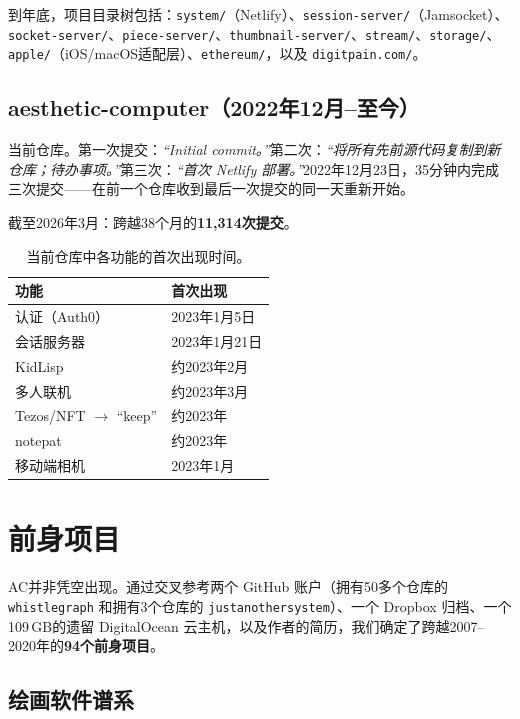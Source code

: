 \documentclass[10pt,letterpaper,twocolumn]{article}
\begin{document}
到年底，项目目录树包括：\texttt{system/}（Netlify）、\texttt{session-server/}（Jamsocket）、\texttt{socket-server/}、\texttt{piece-server/}、\texttt{thumbnail-server/}、\texttt{stream/}、\texttt{storage/}、\texttt{apple/}（iOS/macOS适配层）、\texttt{ethereum/}，以及 \texttt{digitpain.com/}。

\subsection{aesthetic-computer（2022年12月--至今）}

当前仓库。第一次提交：\emph{``Initial commit。''}第二次：\emph{``将所有先前源代码复制到新仓库；待办事项。''}第三次：\emph{``首次 Netlify 部署。''}2022年12月23日，35分钟内完成三次提交——在前一个仓库收到最后一次提交的同一天重新开始。

截至2026年3月：跨越38个月的\textbf{11,314次提交}。

\begin{table}[h]
\small
\centering
\begin{tabular}{ll}
\toprule
\textbf{功能} & \textbf{首次出现} \\
\midrule
认证（Auth0） & 2023年1月5日 \\
会话服务器 & 2023年1月21日 \\
KidLisp & 约2023年2月 \\
多人联机 & 约2023年3月 \\
Tezos/NFT $\rightarrow$ ``keep'' & 约2023年 \\
notepat & 约2023年 \\
移动端相机 & 2023年1月 \\
\bottomrule
\end{tabular}
\caption{当前仓库中各功能的首次出现时间。}
\end{table}


\section{前身项目}

AC并非凭空出现。通过交叉参考两个 GitHub 账户（拥有50多个仓库的 \texttt{whistlegraph} 和拥有3个仓库的 \texttt{justanothersystem}）、一个 Dropbox 归档、一个109\,GB的遗留 DigitalOcean 云主机，以及作者的简历，我们确定了跨越2007--2020年的\textbf{94个前身项目}。

\subsection{绘画软件谱系}
\end{document}
